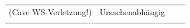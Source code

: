 {\begin{tabularx}{\linewidth}{XXXX}
(Cave WS-Verletzung!)
&
Ursachenabhängig
\\\addlinespace\bottomrule
\end{tabularx}

% 
% 
% 
% 
% 
}














